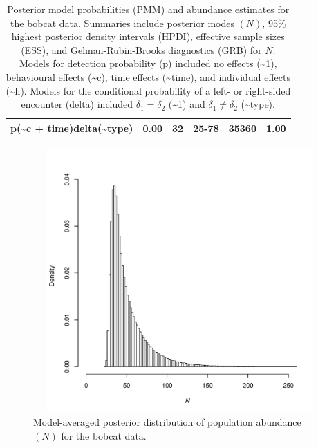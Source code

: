 \documentclass[12pt]{article}
\begin{document}
\begin{table}[ht]
\begin{tabular}{llllll}
  p(\~{}c + time)delta(\~{}type) & 0.00 & 32 & 25-78 & 35360 & 1.00 \\ 
   \hline
\end{tabular}
\caption{Posterior model probabilities (PMM) and abundance estimates for the bobcat data. Summaries include posterior modes $(N)$, 95\% highest posterior density intervals (HPDI), effective sample sizes (ESS), and Gelman-Rubin-Brooks diagnostics (GRB) for $N$. Models for detection probability (p) included no effects (\~{}1), behavioural effects (\~{}c), time effects (\~{}time), and individual effects (\~{}h). Models for the conditional probability of a left- or right-sided encounter (delta) included $\delta_1=\delta_2$ (\~{}1) and $\delta_1 \ne \delta_2$ (\~{}type).} 
\label{tab:modprobs}
\end{table}\begin{figure}
  \includegraphics[width=6in,height=4in]{modaveN.pdf}
  \begin{doublespace}
    \caption{\label{fig:modaveN}Model-averaged posterior distribution of population abundance $(N)$ for the bobcat data.}
  \end{doublespace}
\end{figure}
\end{document}
